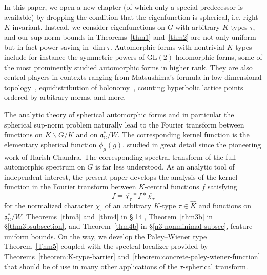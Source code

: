 \documentclass[11pt,oneside]{amsart}
\numberwithin{equation}{section}
\theoremstyle{remark}
\theoremstyle{plain}
\newcommand\GL{\mathrm{GL}}
\newcommand\CC{\mathbb{C}}
\newcommand\mfa{\mathfrak{a}}
\newcommand\ov{\overline}
\newcommand\bs{\backslash}
\begin{document}
In this paper, we open a new chapter (of which only a special predecessor \cite{BHMM} is available) by dropping the condition that the eigenfunction is spherical, i.e. right $K$-invariant. Instead, we consider eigenfunctions on $G$ with arbitrary $K$-types $\tau$, and our sup-norm bounds in Theorems~\ref{thm1} and~\ref{thm2} are not only uniform but in fact power-saving in $\dim \tau$. Automorphic forms with nontrivial $K$-types include for instance the symmetric powers of $\GL(2)$ holomorphic forms, some of the most prominently studied automorphic forms in higher rank. They are also central players in contexts ranging from Matsushima's formula in low-dimensional topology~\cite{LinLipnwski2022}, equidistribution of holonomy~\cite{SarnakWakayama1999,DeverMilicevic2023}, counting hyperbolic lattice points ordered by arbitrary norms, and more.

The analytic theory of spherical automorphic forms and in particular the spherical sup-norm problem naturally lead to the Fourier transform between functions on $K\bs G/K$ and on $\mfa^{\ast}_{\CC}/W$. The corresponding kernel function is the elementary spherical function $\phi_{\mu}(g)$, studied in great detail since the pioneering work of Harish-Chandra. The corresponding spectral transform of the full automorphic spectrum on $G$ is far less understood. As an analytic tool of independent interest, the present paper develops the analysis of the kernel function in the Fourier transform between $K$-central functions $f$ satisfying
\[f = \ov{\chi_{\tau}}\ast f\ast\ov{\chi_{\tau}}\]
for the normalized character $\chi_\tau$ of an arbitrary $K$-type $\tau \in \widehat{K}$ and functions on $\mfa^{\ast}_{\CC}/W$. Theorems~\ref{thm3} and~\ref{thm4} in \S\ref{14}, Theorem~\ref{thm3b} in \S\ref{thm3bsubsection}, and Theorem~\ref{thm4b} in \S\ref{n3-nonminimal-subsec}, feature uniform bounds. On the way, we develop the Paley--Wiener type Theorem~\ref{Thm5} coupled with the spectral localizer provided by Theorems~\ref{theorem:K-type-barrier} and~\ref{theorem:concrete-paley-wiener-function} that should be of use in many other applications of the $\tau$-spherical transform.
\end{document}
